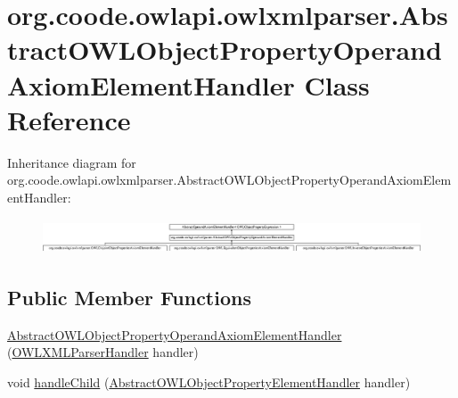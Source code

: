 \hypertarget{classorg_1_1coode_1_1owlapi_1_1owlxmlparser_1_1_abstract_o_w_l_object_property_operand_axiom_element_handler}{\section{org.\-coode.\-owlapi.\-owlxmlparser.\-Abstract\-O\-W\-L\-Object\-Property\-Operand\-Axiom\-Element\-Handler Class Reference}
\label{classorg_1_1coode_1_1owlapi_1_1owlxmlparser_1_1_abstract_o_w_l_object_property_operand_axiom_element_handler}
}
Inheritance diagram for org.\-coode.\-owlapi.\-owlxmlparser.\-Abstract\-O\-W\-L\-Object\-Property\-Operand\-Axiom\-Element\-Handler\-:\begin{figure}[H]
\begin{center}
\leavevmode
\includegraphics[height=1.048689cm]{classorg_1_1coode_1_1owlapi_1_1owlxmlparser_1_1_abstract_o_w_l_object_property_operand_axiom_element_handler}
\end{center}
\end{figure}
\subsection*{Public Member Functions}
\begin{DoxyCompactItemize}
\item 
\hyperlink{classorg_1_1coode_1_1owlapi_1_1owlxmlparser_1_1_abstract_o_w_l_object_property_operand_axiom_element_handler_ae10b493d6e6e02873f7eb546543bc88a}{Abstract\-O\-W\-L\-Object\-Property\-Operand\-Axiom\-Element\-Handler} (\hyperlink{classorg_1_1coode_1_1owlapi_1_1owlxmlparser_1_1_o_w_l_x_m_l_parser_handler}{O\-W\-L\-X\-M\-L\-Parser\-Handler} handler)
\item 
void \hyperlink{classorg_1_1coode_1_1owlapi_1_1owlxmlparser_1_1_abstract_o_w_l_object_property_operand_axiom_element_handler_af8e5c2b154949e50d6879fbb69d06e12}{handle\-Child} (\hyperlink{classorg_1_1coode_1_1owlapi_1_1owlxmlparser_1_1_abstract_o_w_l_object_property_element_handler}{Abstract\-O\-W\-L\-Object\-Property\-Element\-Handler} handler)
\end{DoxyCompactItemize}


